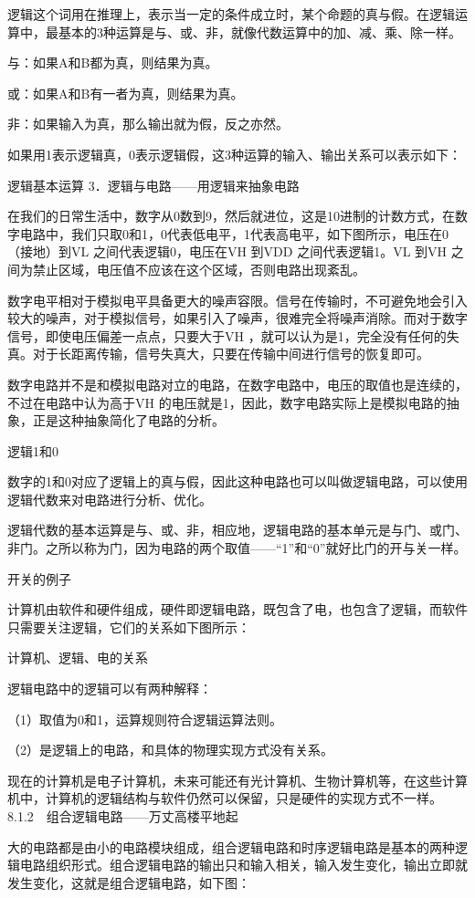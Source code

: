\documentclass[12pt,UTF8]{ctexbook}
\begin{document}
逻辑这个词用在推理上，表示当一定的条件成立时，某个命题的真与假。在逻辑运算中，最基本的3种运算是与、或、非，就像代数运算中的加、减、乘、除一样。

与：如果A和B都为真，则结果为真。

或：如果A和B有一者为真，则结果为真。

非：如果输入为真，那么输出就为假，反之亦然。

如果用1表示逻辑真，0表示逻辑假，这3种运算的输入、输出关系可以表示如下：

逻辑基本运算
3．逻辑与电路——用逻辑来抽象电路

在我们的日常生活中，数字从0数到9，然后就进位，这是10进制的计数方式，在数字电路中，我们只取0和1，0代表低电平，1代表高电平，如下图所示，电压在0（接地）到VL 之间代表逻辑0，电压在VH 到VDD 之间代表逻辑1。VL 到VH 之间为禁止区域，电压值不应该在这个区域，否则电路出现紊乱。

数字电平相对于模拟电平具备更大的噪声容限。信号在传输时，不可避免地会引入较大的噪声，对于模拟信号，如果引入了噪声，很难完全将噪声消除。而对于数字信号，即使电压偏差一点点，只要大于VH ，就可以认为是1，完全没有任何的失真。对于长距离传输，信号失真大，只要在传输中间进行信号的恢复即可。

数字电路并不是和模拟电路对立的电路，在数字电路中，电压的取值也是连续的，不过在电路中认为高于VH 的电压就是1，因此，数字电路实际上是模拟电路的抽象，正是这种抽象简化了电路的分析。

逻辑1和0

数字的1和0对应了逻辑上的真与假，因此这种电路也可以叫做逻辑电路，可以使用逻辑代数来对电路进行分析、优化。

逻辑代数的基本运算是与、或、非，相应地，逻辑电路的基本单元是与门、或门、非门。之所以称为门，因为电路的两个取值——“1”和“0”就好比门的开与关一样。

开关的例子

计算机由软件和硬件组成，硬件即逻辑电路，既包含了电，也包含了逻辑，而软件只需要关注逻辑，它们的关系如下图所示：

计算机、逻辑、电的关系

逻辑电路中的逻辑可以有两种解释：

（1）取值为0和1，运算规则符合逻辑运算法则。

（2）是逻辑上的电路，和具体的物理实现方式没有关系。

现在的计算机是电子计算机，未来可能还有光计算机、生物计算机等，在这些计算机中，计算机的逻辑结构与软件仍然可以保留，只是硬件的实现方式不一样。
8.1.2　组合逻辑电路——万丈高楼平地起

大的电路都是由小的电路模块组成，组合逻辑电路和时序逻辑电路是基本的两种逻辑电路组织形式。组合逻辑电路的输出只和输入相关，输入发生变化，输出立即就发生变化，这就是组合逻辑电路，如下图：
\end{document}
